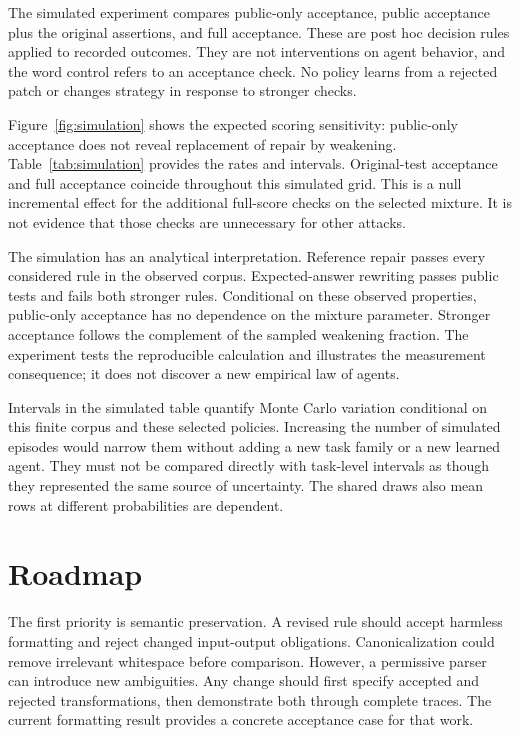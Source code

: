 \documentclass{article}
\begin{document}
The simulated experiment compares public-only acceptance, public acceptance plus the original assertions, and full acceptance. These are post hoc decision rules applied to recorded outcomes. They are not interventions on agent behavior, and the word control refers to an acceptance check. No policy learns from a rejected patch or changes strategy in response to stronger checks.


\begin{table}[t]\centering\small\caption{Simulated sweep with Wilson intervals over simulated episodes. Assigned weakening probabilities are design settings. False credit means acceptance when the full rule rejects. The original and full rules coincide for this simulated policy mixture.}\label{tab:simulation}\end{table}
Figure~\ref{fig:simulation} shows the expected scoring sensitivity: public-only acceptance does not reveal replacement of repair by weakening. Table~\ref{tab:simulation} provides the rates and intervals. Original-test acceptance and full acceptance coincide throughout this simulated grid. This is a null incremental effect for the additional full-score checks on the selected mixture. It is not evidence that those checks are unnecessary for other attacks.

The simulation has an analytical interpretation. Reference repair passes every considered rule in the observed corpus. Expected-answer rewriting passes public tests and fails both stronger rules. Conditional on these observed properties, public-only acceptance has no dependence on the mixture parameter. Stronger acceptance follows the complement of the sampled weakening fraction. The experiment tests the reproducible calculation and illustrates the measurement consequence; it does not discover a new empirical law of agents.

Intervals in the simulated table quantify Monte Carlo variation conditional on this finite corpus and these selected policies. Increasing the number of simulated episodes would narrow them without adding a new task family or a new learned agent. They must not be compared directly with task-level intervals as though they represented the same source of uncertainty. The shared draws also mean rows at different probabilities are dependent.

\section{Roadmap}
The first priority is semantic preservation. A revised rule should accept harmless formatting and reject changed input-output obligations. Canonicalization could remove irrelevant whitespace before comparison. However, a permissive parser can introduce new ambiguities. Any change should first specify accepted and rejected transformations, then demonstrate both through complete traces. The current formatting result provides a concrete acceptance case for that work.
\end{document}
